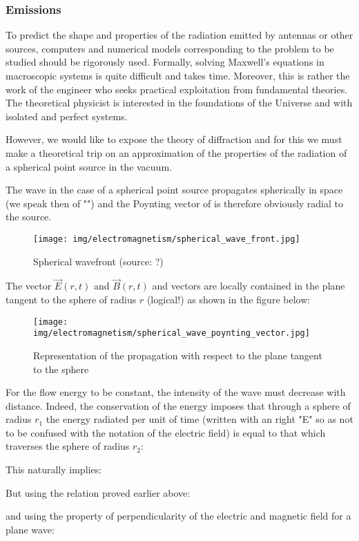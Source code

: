 	\pagebreak
	\subsubsection{Emissions}\label{electromagnetic emissions}
	To predict the shape and properties of the radiation emitted by antennas or other sources, computers and numerical models corresponding to the problem to be studied should be rigorously used. Formally, solving Maxwell's equations in macroscopic systems is quite difficult and takes time. Moreover, this is rather the work of the engineer who seeks practical exploitation from fundamental theories. The theoretical physicist is interested in the foundations of the Universe and with isolated and perfect systems.

	However, we would like to expose the theory of diffraction and for this we must make a theoretical trip on an approximation of the properties of the radiation of a spherical point source in the vacuum.

	The wave in the case of a spherical point source propagates spherically in space (we speak then of "\label{spherical wave}") and the Poynting vector of is therefore obviously radial to the source.
	\begin{figure}[H]
		\centering
		\texttt{[image: img/electromagnetism/spherical\_wave\_front.jpg]}
		\caption[Spherical wavefront]{Spherical wavefront (source: ?)}
	\end{figure}
	The vector $\vec{E}(r,t)$ and $\vec{B}(r,t)$ and vectors are locally contained in the plane tangent to the sphere of radius $r$ (logical!) as shown in the figure below:
	\begin{figure}[H]
		\centering
		\texttt{[image: img/electromagnetism/spherical\_wave\_poynting\_vector.jpg]}
		\caption[]{Representation of the propagation with respect to the plane tangent to the sphere}
	\end{figure}
	For the flow energy to be constant, the intensity of the wave must decrease with distance. Indeed, the conservation of the energy imposes that through a sphere of radius $r_1$ the energy radiated per unit of time (written with an right "E" so as not to be confused with the notation of the electric field) is equal to that which traverses the sphere of radius $r_2$:
	
	This naturally implies:
	
	But using the relation proved earlier above:
	
	and using the property of perpendicularity of the electric and magnetic field for a plane wave:
	
